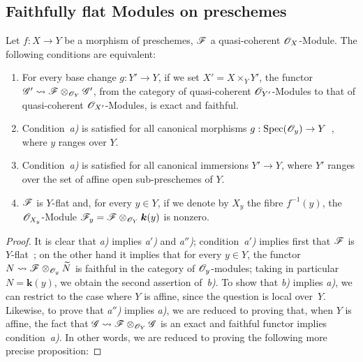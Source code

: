 \subsection{Faithfully flat Modules on preschemes}
\label{subsection:IV.2.2}

\begin{proposition}[2.2.1]
\label{IV.2.2.1}
Let $f:X\to Y$ be a morphism of preschemes, $\mathscr{F}$ a quasi-coherent $\mathscr{O}_X$-Module. The following conditions are equivalent:
\begin{enumerate}
  \item[\emph{a)}] For every base change $g:Y'\to Y$, if we set $X'=X\times_Y Y'$, the functor $\mathscr{G}'\leadsto\mathscr{F}\otimes_{\mathscr{O}_Y}\mathscr{G}'$, from the category of quasi-coherent $\mathscr{O}_{Y'}$-Modules to that of quasi-coherent $\mathscr{O}_{X'}$-Modules, is exact and faithful.
  \item[\emph{a$'$)}] Condition~\emph{a)} is satisfied for all canonical morphisms $g:\operatorname{Spec}(\mathscr{O}_y)\to Y$~, where $y$ ranges over $Y$.
  \item[\emph{a$''$)}] Condition~\emph{a)} is satisfied for all canonical immersions $Y'\to Y$, where $Y'$ ranges over the set of affine open sub-preschemes of $Y$.
  \item[\emph{b)}] $\mathscr{F}$ is $Y$-flat and, for every $y\in Y$, if we denote by $X_y$ the fibre $f^{-1}(y)$, the $\mathscr{O}_{X_y}$-Module $\mathscr{F}_y=\mathscr{F}\otimes_{\mathscr{O}_Y}\boldsymbol{k}(y)$ is nonzero.
\end{enumerate}
\end{proposition}

\begin{proof}
It is clear that \emph{a)} implies \emph{a$'$)} and \emph{a$''$)}; condition~\emph{a$'$)} implies first that $\mathscr{F}$ is $Y$-flat~; on the other hand it implies that for every $y\in Y$, the functor $N\leadsto\mathscr{F}\otimes_{\mathscr{O}_y}\widetilde{N}$ is faithful in the category of $\mathscr{O}_y$-modules; taking in particular $N=\boldsymbol{k}(y)$, we obtain the second assertion of~\emph{b)}.
To show that \emph{b)} implies \emph{a)}, we can restrict to the case where $Y$ is affine, since the question is local over~$Y$.
Likewise, to prove that \emph{a$''$)} implies \emph{a)}, we are reduced to proving that, when $Y$ is affine, the fact that $\mathscr{G}\leadsto\mathscr{F}\otimes_{\mathscr{O}_Y}\mathscr{G}$ is an exact and faithful functor implies condition~\emph{a)}.
In other words, we are reduced to proving the following more precise proposition:
\end{proof}

